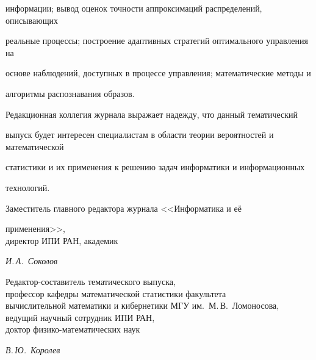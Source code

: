 {{{информации; вывод оценок точности аппроксимаций распределений, описывающих 

реальные процессы; построение адаптивных стратегий оптимального управления на 

основе наблюдений, доступных в процессе управления; математические методы и 

алгоритмы распознавания образов. 

      

      Редакционная коллегия журнала выражает надежду, что данный тематический  

выпуск будет интересен специалистам в области теории вероятностей и математической 

статистики и их применения к решению задач информатики и информационных 

технологий.

      


           \vspace*{20mm}

           \noindent

           Заместитель главного редактора журнала <<Информатика и её 

      применения>>,\\

           директор ИПИ РАН, академик  \hfill

           \textit{И.\,А.~Соколов}\\

           

           \noindent

           Редактор-составитель тематического выпуска,\\

           профессор кафедры математической статистики факультета\\

            вычислительной математики и кибернетики МГУ им.\ М.\,В.~Ломоносова,\\

           ведущий научный сотрудник ИПИ РАН,\\ 

      доктор физико-математических наук \hfill

            \textit{В.\,Ю.~Королев}

           

           } }

           }

